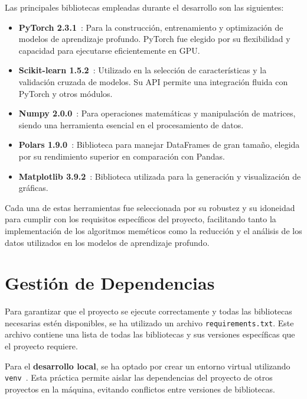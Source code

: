 Las principales bibliotecas empleadas durante el desarrollo son las siguientes:
\begin{itemize}
      \item \textbf{PyTorch 2.3.1}~\cite{ketkar_introduction_2021, noauthor_torchcuda_nodate}: Para la construcción,
            entrenamiento y optimización de modelos de aprendizaje profundo.
            PyTorch fue elegido por su flexibilidad y capacidad para ejecutarse eficientemente en GPU\@.
      \item \textbf{Scikit-learn 1.5.2}~\cite{kramer_scikit-learn_2016}: Utilizado en la selección de características y
            la validación cruzada de modelos.
            Su API permite una integración fluida con PyTorch y otros módulos.
      \item \textbf{Numpy 2.0.0}~\cite{noauthor_numpy_nodate}: Para operaciones matemáticas y manipulación de matrices,
            siendo una herramienta esencial en el procesamiento de datos.
      \item \textbf{Polars 1.9.0}~\cite{noauthor_polars_nodate}: Biblioteca para manejar DataFrames de gran tamaño,
            elegida por su rendimiento superior en comparación con Pandas.
      \item \textbf{Matplotlib 3.9.2}~\cite{noauthor_matplotlib_nodate}: Biblioteca utilizada para la generación y
            visualización de gráficas.
\end{itemize}

Cada una de estas herramientas fue seleccionada por su robustez y su idoneidad para cumplir con los requisitos
específicos del proyecto, facilitando tanto la implementación de los algoritmos meméticos como la reducción y el
análisis de los datos utilizados en los modelos de aprendizaje profundo.

\section{Gestión de Dependencias}\label{sec:gestion-de-dependencias}
Para garantizar que el proyecto se ejecute correctamente y todas las bibliotecas necesarias estén disponibles, se ha
utilizado un archivo \texttt{requirements.txt}.
Este archivo contiene una lista de todas las bibliotecas y sus versiones específicas que el proyecto requiere.


Para el \textbf{desarrollo local}, se ha optado por crear un entorno virtual utilizando
\texttt{venv}~\cite{noauthor_creation_nodate}.
Esta práctica permite aislar las dependencias del proyecto de otros proyectos en la máquina, evitando conflictos entre
versiones de bibliotecas.


